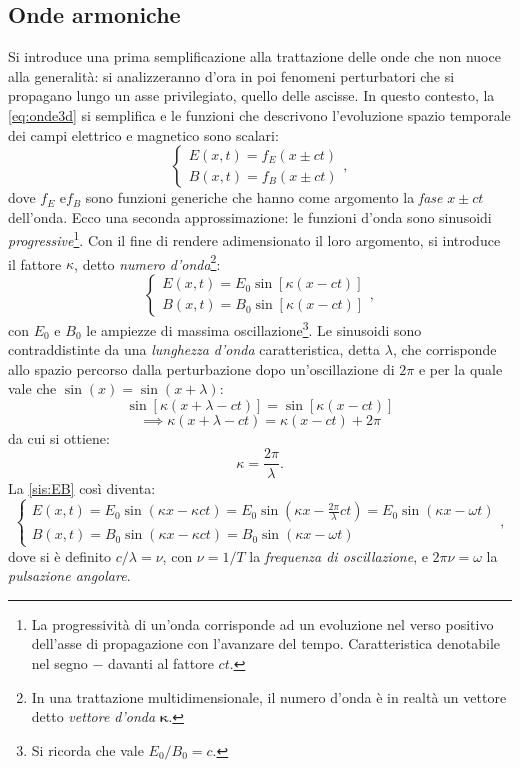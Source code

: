 \documentclass[a4paper,11pt]{report}
\begin{document}
\subsection{Onde armoniche}
Si introduce una prima semplificazione alla trattazione delle onde che non nuoce alla generalità: si analizzeranno d'ora in poi fenomeni perturbatori che si propagano lungo un asse privilegiato, quello delle ascisse. In questo contesto, la \eqref{eq:onde3d} si semplifica e le funzioni che descrivono l'evoluzione spazio temporale dei campi elettrico e magnetico sono scalari:
\begin{equation}
\begin{cases}
E(x,t) = f_E (x \pm ct) \\
B(x,t) = f_B (x \pm ct) 
\end{cases}
,
\end{equation}
dove $f_E$ e$f_B$ sono funzioni generiche che hanno come argomento la \textit{fase} $x \pm ct$ dell'onda.
Ecco una seconda approssimazione: le funzioni d'onda sono sinusoidi \textit{progressive}\footnote{La progressività di un'onda corrisponde ad un evoluzione nel verso positivo dell'asse di propagazione con l'avanzare del tempo. Caratteristica denotabile nel segno $-$ davanti al fattore $ct$.}. Con il fine di rendere adimensionato il loro argomento, si introduce il fattore $\kappa$, detto \textit{numero d'onda}\footnote{In una trattazione multidimensionale, il numero d'onda è in realtà un vettore detto \textit{vettore d'onda} $\bm{\kappa}$.}:
\begin{equation}
\begin{cases}
E(x,t) = E_0 \sin [\kappa(x-ct)] \\
B(x,t) = B_0 \sin[\kappa(x-ct)] 
\label{sis:EB}
\end{cases}
,
\end{equation}
con $E_0$ e $B_0$ le ampiezze di massima oscillazione\footnote{Si ricorda che vale $E_0/B_0 = c$.}. Le sinusoidi sono contraddistinte da una \textit{lunghezza d'onda} caratteristica, detta $\lambda$, che corrisponde allo spazio percorso dalla perturbazione dopo un'oscillazione di $2\pi$ e per la quale vale che $\sin(x) = \sin(x+\lambda)$:
\begin{equation}
\sin [\kappa(x+\lambda-ct)] = \sin [\kappa(x-ct)] 
\end{equation}
\begin{equation}
\implies \kappa(x+\lambda-ct) =  \kappa(x-ct) + 2\pi
\end{equation}
da cui si ottiene: 
\begin{equation}
 \kappa =  \frac{2\pi}{\lambda}.
\end{equation}
La \eqref{sis:EB} così diventa: 
\begin{equation}
\begin{cases}
E(x,t) = E_0 \sin (\kappa x-\kappa ct) =E_0 \sin (\kappa x- \frac{2\pi}{\lambda} ct) = E_0\sin (\kappa x- \omega t) \\
B(x,t) = B_0 \sin (\kappa x-\kappa ct) =B_0 \sin (\kappa x- \omega t)
\label{sis:EB_k}
\end{cases}
,
\end{equation}
dove si è definito $c/\lambda = \nu$, con $\nu = 1/T$ la \textit{frequenza di oscillazione}, e $2\pi \nu = \omega$ la \textit{pulsazione angolare}.
\end{document}
